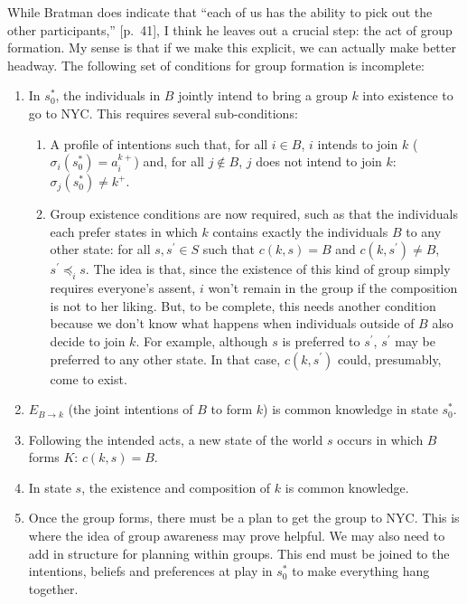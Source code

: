 \documentclass[
11pt,
titlepage,
reqno,
]{article}%
\theoremstyle{definition}
\begin{document}
	While Bratman does indicate that ``each of us has the ability to pick out the other participants,'' [p.\ 41], I think he leaves out a crucial step: the act of group formation. My sense is that if we make this explicit, we can actually make better headway. The following set of conditions for group formation is incomplete:
	\begin{enumerate}
		\item In $s_0^\ast$, the individuals in $B$ jointly intend to bring a group $k$ into existence to go to NYC. This requires several sub-conditions:
		\begin{enumerate}
			\item A profile of intentions such that, for all $i\in B$, $i$ intends to join $k$ ( $\sigma_i(s_0^\ast)=a_i^{k+}$) and, for all $j\notin B$, $j$ does not intend to join $k$: $\sigma_j(s_0^\ast)\ne k^+$.
			\item Group existence conditions are now required, such as that the individuals each prefer states in which $k$  contains exactly the individuals $B$ to any other state: for all $s,s^\prime\in S$ such that $c(k,s)=B$ and $c(k,s^\prime)\ne B$, $s^\prime\preceq_i s$. The idea is that, since the existence of this kind of group simply requires everyone's assent, $i$ won't remain in the group if the composition is not to her liking. But, to be complete, this needs another condition because we don't know what happens when  individuals outside of $B$ also decide to join $k$. For example,   although $s$ is  preferred to $s^\prime$, $s^\prime$ may be preferred to any other state. In that case, $c(k,s^\prime)$ could, presumably, come to exist.		
		\end{enumerate} 
		\item $E_{B\rightarrow k}$ (the joint intentions of $B$ to form $k$) is common knowledge in state $s_0^\ast$.
		\item Following the intended acts, a new state of the world $s$ occurs in which $B$ forms $K$: $c(k,s)=B$.
		\item In state $ s$, the existence and composition of $k$ is common knowledge. 
		\item Once the group forms, there must be a plan to get the group to NYC. This is where the idea of group awareness may prove helpful. We may also need to add in structure for planning within groups. This end must be joined to the intentions, beliefs and preferences at play in $s_0^\ast$ to make everything hang together. 
	\end{enumerate}
	
\end{document}
